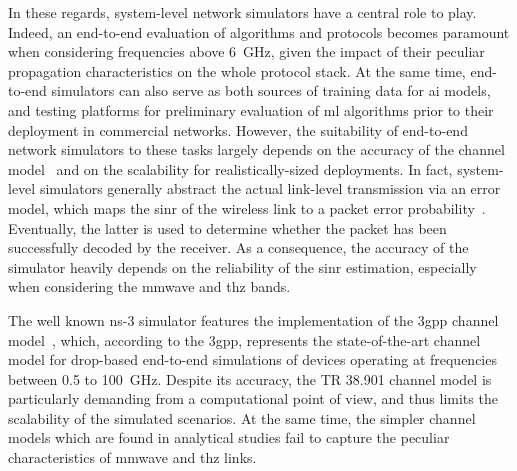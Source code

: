 In these regards, system-level network simulators have a central role to play. Indeed, an end-to-end evaluation of algorithms and protocols becomes paramount when considering frequencies above 6~GHz, given the impact of their peculiar propagation characteristics on the whole protocol stack.
At the same time, end-to-end simulators can also serve as both sources of training data for \gls{ai} models, and testing platforms for preliminary evaluation of \gls{ml} algorithms prior to their deployment in commercial networks.
However, the suitability of end-to-end network simulators to these tasks largely depends on the accuracy of the channel model~\cite{testolina2020scalable} and on the scalability for realistically-sized deployments.
In fact, system-level simulators generally abstract the actual link-level transmission via an error model, which maps the \gls{sinr} of the wireless link to a packet error probability~\cite{lagen2020new}. Eventually, the latter is used to determine whether the packet has been successfully decoded by the receiver. As a consequence, the accuracy of the simulator heavily depends on the reliability of the \gls{sinr} estimation, especially when considering the \gls{mmwave} and \gls{thz} bands. 

The well known ns-3 simulator features the implementation of the \gls{3gpp} channel model~\cite{TR38901}, which, according to the \gls{3gpp}, represents the state-of-the-art channel model for drop-based end-to-end simulations of devices operating at frequencies between 0.5 to 100~GHz. Despite its accuracy, the TR 38.901 channel model is particularly demanding from a computational point of view, and thus limits the scalability of the simulated scenarios. 
At the same time, the simpler channel models which are found in analytical studies fail to capture the peculiar characteristics of \gls{mmwave} and \gls{thz} links. 

